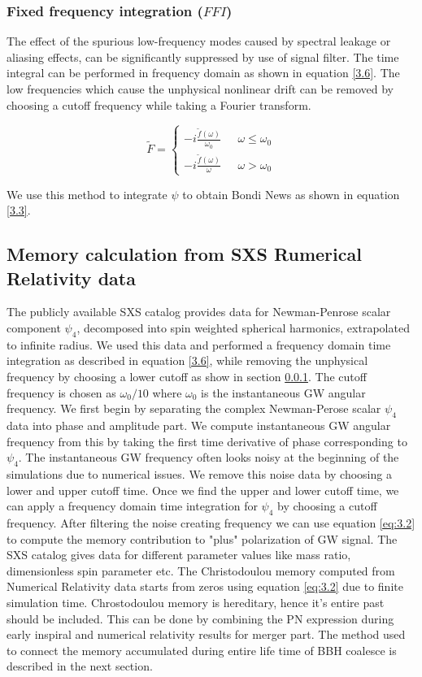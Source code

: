 \documentclass[prd,preprintnumbers,twocolumn,eqsecnum,floatfix,letter]{revtex4}
\begin{document}
\subsubsection{Fixed frequency integration ($\mathit{FFI}$)}\label{FFI}
The effect of the spurious low-frequency modes caused by spectral leakage or aliasing effects, can be significantly suppressed by use of signal filter. The time integral can be performed in frequency domain as shown in equation \ref{3.6}. The low frequencies which cause the unphysical nonlinear drift can be removed by choosing a cutoff frequency while taking a Fourier transform.   

\[\tilde{F} =
\begin{cases}
-\mathit{i} \frac{\tilde{f}(\omega)}{\omega_0} & \text{ $\omega\leq\omega_0$} \\
-\mathit{i} \frac{\tilde{f}(\omega)}{\omega} & \text{ $\omega>\omega_0$} 
\end{cases}\]

We use this method to integrate $\psi$ to obtain Bondi News as shown in equation \ref{3.3}.

\subsection{Memory calculation from SXS Rumerical Relativity data}
The publicly available SXS catalog provides data for Newman-Penrose scalar component $\psi_4$, decomposed into spin weighted spherical harmonics, extrapolated to infinite radius. We used this data and  performed a frequency domain time integration as described in equation \ref{3.6}, while removing the unphysical frequency by choosing a lower cutoff as show in section \ref{FFI}. The cutoff frequency is chosen as $\omega_0/10$ where $\omega_0$ is the instantaneous GW angular frequency. We first begin by separating the complex Newman-Perose scalar $\psi_4$ data into phase and amplitude part. We compute instantaneous GW angular frequency from this by taking the first time derivative of phase corresponding to $\psi_4$. The instantaneous GW frequency often looks noisy at the beginning of the simulations due to numerical issues. We remove this noise data by choosing a lower and upper cutoff time. Once we find the upper and lower cutoff time, we can apply a frequency domain time integration for $\psi_4$ by choosing a cutoff frequency. After filtering the noise creating frequency we can use equation \ref{eq:3.2} to compute the memory contribution to "plus" polarization of GW signal. The SXS catalog gives data for different parameter values like mass ratio, dimensionless spin parameter etc. The Christodoulou memory computed from Numerical Relativity data starts from zeros using equation \ref{eq:3.2} due to finite simulation time. Chrostodoulou memory is hereditary, hence it's entire past should be included. This can be done by combining the PN expression during early inspiral and numerical relativity results for merger part. The method used to connect the memory accumulated during entire life time of BBH coalesce is described in the next section. 
\end{document}
